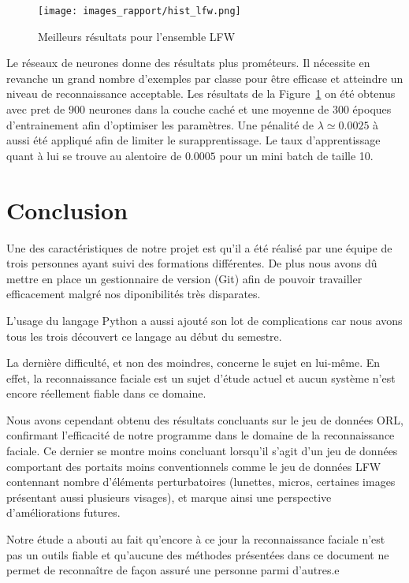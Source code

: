 \documentclass[a4paper,10pt,twocolumn]{extarticle}
\begin{document}
\begin{figure}[H]
  \begin{center}
    \texttt{[image: images\_rapport/hist\_lfw.png]}
    \caption{Meilleurs résultats pour l'ensemble LFW}
    \label{fig:results_lfw}
  \end{center}
\end{figure}
Le réseaux de neurones donne des résultats plus prométeurs. Il nécessite en revanche un grand nombre d'exemples par classe pour être efficase et atteindre un niveau de reconnaissance acceptable. Les résultats de la Figure~\ref{fig:results_lfw} on été obtenus avec pret de $900$ neurones dans la couche caché et une moyenne de $300$ époques d'entrainement afin d'optimiser les paramètres. Une pénalité de $\lambda \simeq 0.0025$ à aussi été appliqué afin de limiter le surapprentissage. Le taux d'apprentissage quant à lui se trouve au alentoire de $0.0005$ pour un mini batch de taille 10.

\section{Conclusion}
Une des caractéristiques de notre projet est qu'il a été réalisé par une équipe de trois personnes ayant suivi des formations différentes. De plus nous avons dû mettre en place un gestionnaire de version (Git) afin de pouvoir travailler efficacement malgré nos diponibilités très disparates.

L'usage du langage Python a aussi ajouté son lot de complications car nous avons tous les trois découvert ce langage au début du semestre.

La dernière difficulté, et non des moindres, concerne le sujet en lui-même. En effet, la reconnaissance faciale est un sujet d'étude actuel et aucun système n'est encore réellement fiable dans ce domaine.

Nous avons cependant obtenu des résultats concluants sur le jeu de données ORL, confirmant l'efficacité de notre programme dans le domaine de la reconnaissance faciale. Ce dernier se montre moins concluant lorsqu'il s'agit d'un jeu de données comportant des portaits moins conventionnels comme le jeu de données LFW contennant nombre d'éléments perturbatoires (lunettes, micros, certaines images présentant aussi plusieurs visages), et marque ainsi une perspective d'améliorations futures.

Notre étude a abouti au fait qu'encore à ce jour la reconnaissance faciale n'est pas un outils fiable et qu'aucune des méthodes présentées dans ce document ne permet de reconnaître de façon assuré une personne parmi d'autres.e
\end{document}

